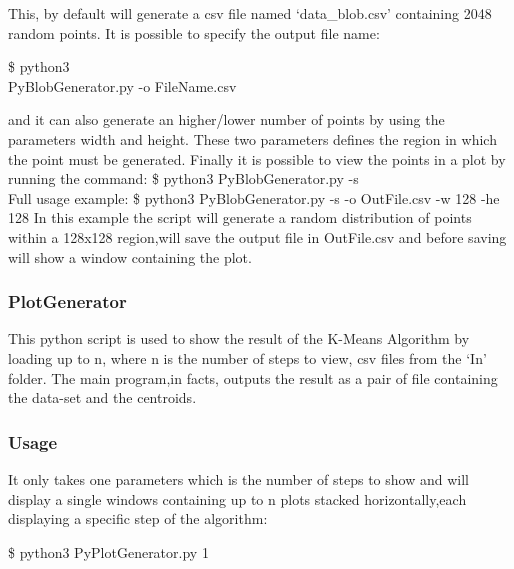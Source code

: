 \documentclass[10pt,twocolumn,letterpaper]{article}
\newenvironment{Shaded}{}{}
\newcommand{\ExtensionTok}[1]{#1}
\newcommand{\NormalTok}[1]{#1}
\begin{document}
This, by default will generate a csv file named `data\_blob.csv' containing 2048 random points.\newline
It is possible to specify the output file name:\newline

\begin{Shaded}
\begin{Highlighting}[]
\NormalTok{\$ }\ExtensionTok{python3}\\
\NormalTok{ PyBlobGenerator.py -o FileName.csv}
\end{Highlighting}
\end{Shaded}
and it can also generate an higher/lower number of points by using the parameters width and height.\newline
These two parameters defines the region in which the point must be generated.\newline
Finally it is possible to view the points in a plot by running the command:\newline
\NormalTok{\$ }\ExtensionTok{python3}\NormalTok{ PyBlobGenerator.py -s }\\
Full usage example:\newline
\NormalTok{\$ }\ExtensionTok{python3}\NormalTok{ PyBlobGenerator.py -s -o OutFile.csv -w 128 -he 128 }\newline
In this example the script will generate a random distribution of points within a 128x128 region,will save the output file in 
OutFile.csv and before saving will show a window containing the plot.\newline
\subsubsection{PlotGenerator}
This python script is used to show the result of the K-Means Algorithm by loading up to n, where n is the number of steps to view, csv 
files from the `In' folder.\newline
The main program,in facts, outputs the result as a pair of file containing the data-set and the centroids.\newline
\subsubsection{Usage}
It only takes one parameters which is the number of steps to show and will display a single windows containing up to n plots stacked
horizontally,each displaying a specific step of the algorithm:\newline
\begin{Shaded}
\begin{Highlighting}[]
\NormalTok{\$ }\ExtensionTok{python3} \NormalTok{ PyPlotGenerator.py 1}
\end{Highlighting}
\end{Shaded}
\end{document}
